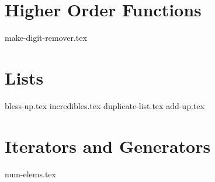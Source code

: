 \documentclass{exam}
\begin{document}
\section{Higher Order Functions}
\begin{questions}
    {make-digit-remover.tex}
\end{questions}

\section{Lists}
\begin{questions}
    {bless-up.tex}
    {incredibles.tex}
    {duplicate-list.tex}
    {add-up.tex}
\end{questions}

\section{Iterators and Generators}
\begin{questions}
    {num-elems.tex}
\end{questions}
\end{document}
